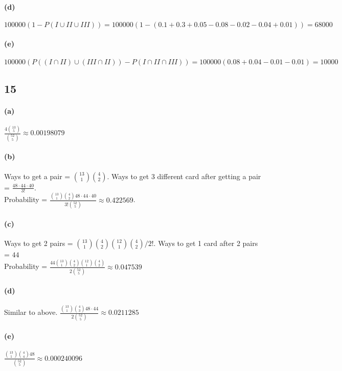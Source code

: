 \documentclass[letter]{article}
\begin{document}
\paragraph*{(d)}
$100000(1-P(I\cup II\cup III)) = 100000(1-(0.1+0.3+0.05-0.08-0.02-0.04+0.01)) = 68000$
\paragraph*{(e)}
$100000 (P((I\cap II) \cup (III\cap II)) - P(I \cap II \cap III)) = 100000(0.08+0.04-0.01-0.01) = 10000$

\subsection*{15}
\paragraph*{(a)}
$\frac{4{13 \choose 5}}{{52 \choose 5}}\approx 0.00198079$
\paragraph*{(b)}
Ways to get a pair = ${13 \choose 1}{4\choose 2}$. Ways to get 3 different card after getting a pair = $\frac{48\cdot 44\cdot 40}{3!}$.\\
Probability = $\frac{{13 \choose 1}{4\choose 2}48\cdot 44\cdot 40}{{3!}{52\choose 5}}\approx 0.422569$.
\paragraph*{(c)}
Ways to get 2 pairs = ${13 \choose 1}{4\choose 2}{12 \choose 1}{4\choose 2}/2!$. Ways to get 1 card after 2 pairs = $44$\\
Probability = $\frac{44{13 \choose 1}{4\choose 2}{12 \choose 1}{4\choose 2}}{2{52 \choose 5}}\approx 0.047539$
\paragraph*{(d)}
Similar to above.
$\frac{{13 \choose 1}{4\choose 3}48\cdot 44}{2{52 \choose 5}}\approx 0.0211285$
\paragraph*{(e)}
$\frac{{13 \choose 1}{4\choose 4}48}{{52 \choose 5}}\approx 0.000240096$
\end{document}
